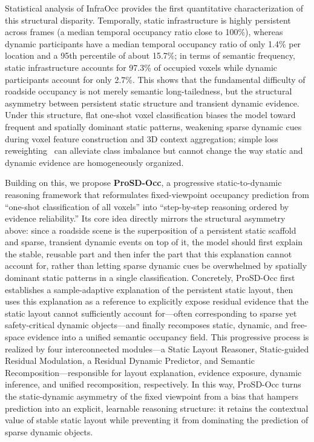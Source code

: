 Statistical analysis of InfraOcc provides the first quantitative
characterization of this structural disparity. Temporally, static
infrastructure is highly persistent across frames (a median temporal occupancy
ratio close to 100\%), whereas dynamic participants have a median temporal
occupancy ratio of only 1.4\% per location and a 95th percentile of about
15.7\%; in terms of semantic frequency, static infrastructure accounts for
97.3\% of occupied voxels while dynamic participants account for only 2.7\%.
This shows that the fundamental difficulty of roadside occupancy is not merely
semantic long-tailedness, but the structural asymmetry between persistent static
structure and transient dynamic evidence. Under this structure, flat one-shot
voxel classification biases the model toward frequent and spatially dominant
static patterns, weakening sparse dynamic cues during voxel feature construction
and 3D context aggregation; simple loss
reweighting~\cite{FocalLoss,ClassBalancedLoss} can alleviate class imbalance but
cannot change the way static and dynamic evidence are homogeneously organized.

Building on this, we propose \textbf{ProSD-Occ}, a progressive
static-to-dynamic reasoning framework that reformulates fixed-viewpoint
occupancy prediction from ``one-shot classification of all voxels'' into
``step-by-step reasoning ordered by evidence reliability.'' Its core idea
directly mirrors the structural asymmetry above: since a roadside scene is the
superposition of a persistent static scaffold and sparse, transient dynamic
events on top of it, the model should first explain the stable, reusable part
and then infer the part that this explanation cannot account for, rather than
letting sparse dynamic cues be overwhelmed by spatially dominant static patterns
in a single classification. Concretely, ProSD-Occ first establishes a
sample-adaptive explanation of the persistent static layout, then uses this
explanation as a reference to explicitly expose residual evidence that the
static layout cannot sufficiently account for---often corresponding to sparse
yet safety-critical dynamic objects---and finally recomposes static, dynamic,
and free-space evidence into a unified semantic occupancy field. This
progressive process is realized by four interconnected modules---a Static Layout
Reasoner, Static-guided Residual Modulation, a Residual Dynamic Predictor, and
Semantic Recomposition---responsible for layout explanation, evidence exposure,
dynamic inference, and unified recomposition, respectively. In this way,
ProSD-Occ turns the static-dynamic asymmetry of the fixed viewpoint from a bias
that hampers prediction into an explicit, learnable reasoning structure: it
retains the contextual value of stable static layout while preventing it from
dominating the prediction of sparse dynamic objects.

